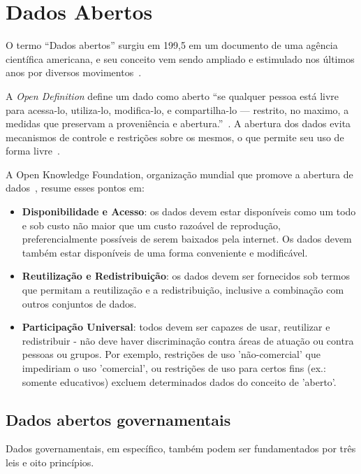 \chapter{Dados Abertos}

O termo \enquote{Dados abertos} surgiu em 199,5 em um documento de uma agência científica americana, e seu conceito vem sendo ampliado e estimulado nos últimos anos por diversos movimentos~\cite{seijiconectados}. 

A \emph{Open Definition} define um dado como aberto \enquote{se qualquer pessoa está livre para acessa-lo, utiliza-lo, modifica-lo, e compartilha-lo — restrito, no maximo, a medidas que preservam a proveniência e abertura.}~\cite{opendefinition}. A abertura dos dados evita mecanismos de controle e restrições sobre os mesmos, o que permite seu uso de forma livre~\cite{seijiconectados}.

A Open Knowledge Foundation, organização mundial que promove a abertura de dados~\cite{openknowledge}, resume esses pontos em:

\begin{itemize}
\item \textbf{Disponibilidade e Acesso}: os dados devem estar disponíveis como um todo e sob custo não maior que um custo razoável de reprodução, preferencialmente possíveis de serem baixados pela internet. Os dados devem também estar disponíveis de uma forma conveniente e modificável.

\item \textbf{Reutilização e Redistribuição}: os dados devem ser fornecidos sob termos que permitam a reutilização e a redistribuição, inclusive a combinação com outros conjuntos de dados.

\item \textbf{Participação Universal}: todos devem ser capazes de usar, reutilizar e redistribuir - não deve haver discriminação contra áreas de atuação ou contra pessoas ou grupos. Por exemplo, restrições de uso 'não-comercial' que impediriam o uso 'comercial', ou restrições de uso para certos fins (ex.: somente educativos) excluem determinados dados do conceito de 'aberto'.
\end{itemize}

\section{Dados abertos governamentais}
Dados governamentais, em específico, também podem ser fundamentados por três leis e oito princípios.


